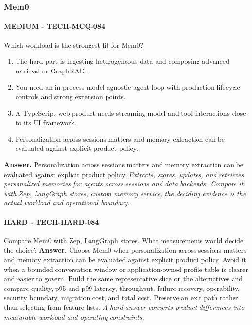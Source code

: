 \subsubsection*{Mem0}
\paragraph{MEDIUM - TECH-MCQ-084} Which workload is the strongest fit for Mem0?
\begin{enumerate}[label=\Alph*.]
\item The hard part is ingesting heterogeneous data and composing advanced retrieval or GraphRAG.
\item You need an in-process model-agnostic agent loop with production lifecycle controls and strong extension points.
\item A TypeScript web product needs streaming model and tool interactions close to its UI framework.
\item Personalization across sessions matters and memory extraction can be evaluated against explicit product policy.
\end{enumerate}
\textbf{Answer.} Personalization across sessions matters and memory extraction can be evaluated against explicit product policy.
\textit{Extracts, stores, updates, and retrieves personalized memories for agents across sessions and data backends. Compare it with Zep, LangGraph stores, custom memory service; the deciding evidence is the actual workload and operational boundary.}
\paragraph{HARD - TECH-HARD-084} Compare Mem0 with Zep, LangGraph stores. What measurements would decide the choice?
\textbf{Answer.} Choose Mem0 when personalization across sessions matters and memory extraction can be evaluated against explicit product policy. Avoid it when a bounded conversation window or application-owned profile table is clearer and easier to govern. Build the same representative slice on the alternatives and compare quality, p95 and p99 latency, throughput, failure recovery, operability, security boundary, migration cost, and total cost. Preserve an exit path rather than selecting from feature lists.
\textit{A hard answer converts product differences into measurable workload and operating constraints.}
